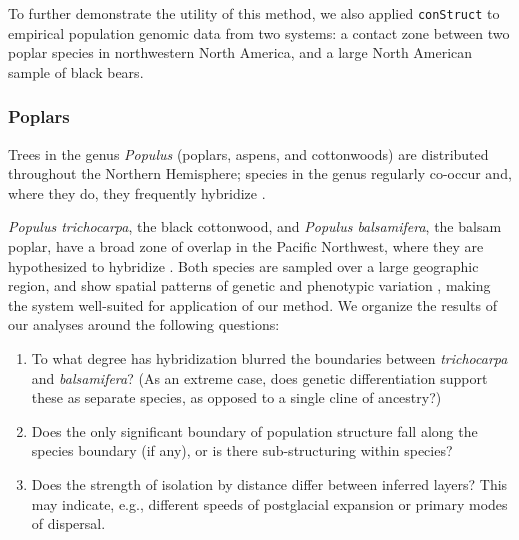 \documentclass[10pt,letterpaper]{article}
\begin{document}
To further demonstrate the utility of this method, 
we also applied \texttt{conStruct} to empirical population genomic data from two systems:
a contact zone between two poplar species in northwestern North America,
and a large North American sample of black bears.

\subsubsection*{Poplars}

Trees in the genus \textit{Populus} (poplars, aspens, and cottonwoods) 
are distributed throughout the Northern Hemisphere;
species in the genus regularly co-occur and, 
where they do, they frequently hybridize \cite{eckenwalder1984, Cronk2005}.

\textit{Populus trichocarpa}, the black cottonwood,
and \textit{Populus balsamifera}, the balsam poplar,
have a broad zone of overlap in the Pacific Northwest,
where they are hypothesized to hybridize \cite{geraldes_etal_2014, suarezgonzalez_etal_2016}.
Both species are sampled over a large geographic region, 
and show spatial patterns of genetic and phenotypic variation \cite{slavov_etal_2012, mckown_etal_2013},
making the system well-suited for application of our method.
We organize the results of our analyses around the following questions: 
\begin{enumerate}

    \item To what degree has hybridization blurred the boundaries between 
        \textit{trichocarpa} and \textit{balsamifera}?
        (As an extreme case, does genetic differentiation support these as separate species,
        as opposed to a single cline of ancestry?)

    \item Does the only significant boundary of population structure
        fall along the species boundary (if any),
        or is there sub-structuring within species?

    \item Does the strength of isolation by distance differ between inferred layers?
        This may indicate, e.g., different speeds of postglacial expansion
        or primary modes of dispersal.

\end{enumerate}
\end{document}
